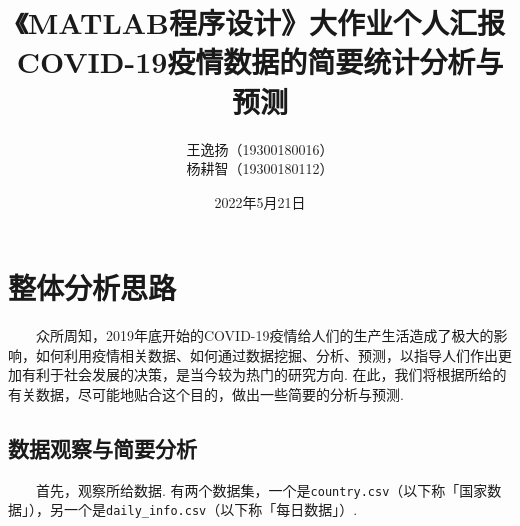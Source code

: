 \documentclass[a4paper, titlepage]{article}
\begin{document}
    \renewcommand{\thefootnote}{\fnsymbol{footnote}}
    \title{{\small《MATLAB程序设计》大作业个人汇报}\\COVID-19疫情数据的简要统计分析与预测\footnotemark[1]}
    \author{王逸扬（19300180016）\\杨耕智（19300180112）{\kaishu }}
    \date{2022年5月21日}
    \maketitle
    \renewcommand{\thefootnote}{\araboc{footnote}}
    \thispagestyle{empty}
    \renewcommand{\contentsname}{\centering 目录\\\quad\\}
    \tableofcontents
    \thispagestyle{empty}
    \newpage
    \pagestyle{headings}
   

    \section{整体分析思路}
        　　众所周知，2019年底开始的COVID-19疫情给人们的生产生活造成了极大的影响，如何利用疫情相关数据、如何通过数据挖掘、分析、预测，以指导人们作出更加有利于社会发展的决策，是当今较为热门的研究方向. 在此，我们将根据所给的有关数据，尽可能地贴合这个目的，做出一些简要的分析与预测.

        \subsection{数据观察与简要分析}
        　　首先，观察所给数据. 有两个数据集，一个是\texttt{country.csv}（以下称「国家数据」），另一个是\texttt{daily\_info.csv}（以下称「每日数据」）. 
\end{document}
